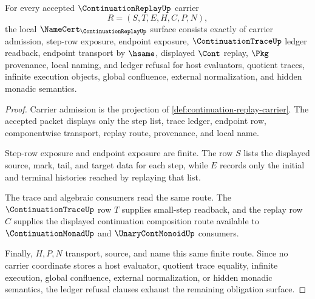 \begin{theorem}\label{thm:continuation-replay-namecert-obligations}
For every accepted $\ContinuationReplayUp$ carrier
$$
R=(S,T,E,H,C,P,N),
$$
the local $\NameCert_{\ContinuationReplayUp}$ surface consists exactly of carrier admission, step-row exposure, endpoint exposure, $\ContinuationTraceUp$ ledger readback, endpoint transport by $\hsame$, displayed $\Cont$ replay, $\Pkg$ provenance, local naming, and ledger refusal for host evaluators, quotient traces, infinite execution objects, global confluence, external normalization, and hidden monadic semantics.
\end{theorem}
\begin{proof}
Carrier admission is the projection of \autoref{def:continuation-replay-carrier}. The accepted packet displays only the step list, trace ledger, endpoint row, componentwise transport, replay route, provenance, and local name.

Step-row exposure and endpoint exposure are finite. The row $S$ lists the displayed source, mark, tail, and target data for each step, while $E$ records only the initial and terminal histories reached by replaying that list.

The trace and algebraic consumers read the same route. The $\ContinuationTraceUp$ row $T$ supplies small-step readback, and the replay row $C$ supplies the displayed continuation composition route available to $\ContinuationMonadUp$ and $\UnaryContMonoidUp$ consumers.

Finally, $H,P,N$ transport, source, and name this same finite route. Since no carrier coordinate stores a host evaluator, quotient trace equality, infinite execution, global confluence, external normalization, or hidden monadic semantics, the ledger refusal clauses exhaust the remaining obligation surface.
\end{proof}

